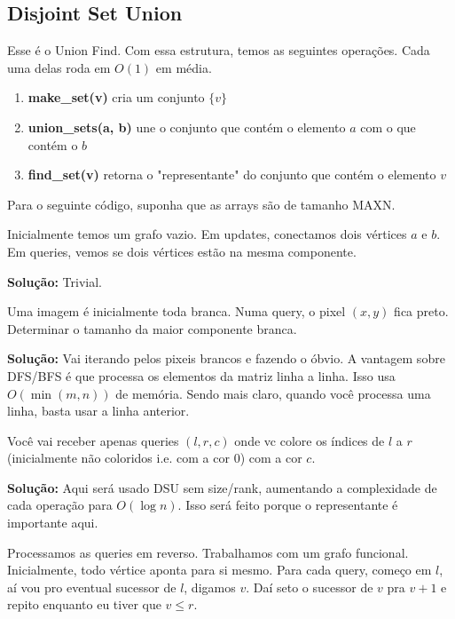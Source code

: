 \subsection{Disjoint Set Union}

Esse é o Union Find. Com essa estrutura, temos as seguintes operações.
Cada uma delas roda em $O(1)$ em média.

\begin{enumerate}
    \item  \textbf{make\_set(v)} cria um conjunto $\{v\}$
    \item \textbf{union\_sets(a, b)} une o conjunto que contém o elemento $a$ com o que contém o $b$
    \item \textbf{find\_set(v)} retorna o "representante" do conjunto que contém o elemento $v$
\end{enumerate}

Para o seguinte código, suponha que as arrays são de tamanho $\text{MAXN}$.


 Inicialmente temos um grafo vazio. Em updates, conectamos dois vértices
$a$ e $b$. Em queries, vemos se dois vértices estão na mesma componente.

\textbf{Solução:} Trivial. 

 Uma imagem é inicialmente toda branca. Numa query, o pixel $(x, y)$ fica preto.
Determinar o tamanho da maior componente branca.

\textbf{Solução:} Vai iterando pelos pixeis brancos e fazendo o óbvio. A vantagem sobre DFS/BFS é que
processa os elementos da matriz linha a linha. Isso usa $O(\min(m, n))$ de memória. Sendo mais claro,
quando você processa uma linha, basta usar a linha anterior.

 Você vai receber apenas queries $(l, r, c)$ onde vc colore os índices
de $l$ a $r$ (inicialmente não coloridos i.e. com a cor $0$) com a cor $c$.

\textbf{Solução:} Aqui será usado DSU sem size/rank, aumentando a complexidade de cada operação para $O(\log n)$.
Isso será feito porque o representante é importante aqui. 

Processamos as queries em reverso. Trabalhamos com um grafo funcional. Inicialmente, todo vértice aponta para si
mesmo. Para cada query, começo em $l$, aí vou pro eventual sucessor de $l$, digamos $v$. Daí seto o sucessor de
$v$ pra $v+1$ e repito enquanto eu tiver que $v \leq r$.

